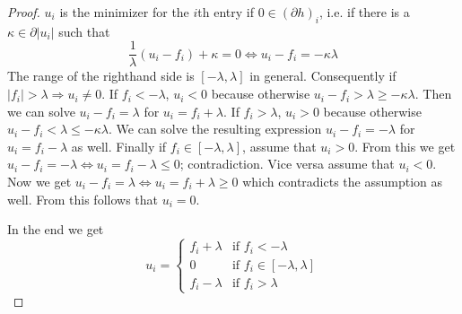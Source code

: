 \documentclass[10pt,a4paper]{article}
\begin{document}
\begin{proof}
  $u_{i}$ is the minimizer for the $i$th entry if $0 \in (\partial h)_{i}$, i.e. if there is a $\kappa \in \partial |u_{i}|$ such that
  \begin{equation*}
    \frac{1}{\lambda} (u_{i} - f_{i}) + \kappa = 0 \Leftrightarrow u_{i} - f_{i} = -\kappa\lambda
  \end{equation*}
  The range of the righthand side is $[-\lambda, \lambda]$ in general.
  Consequently if $|f_{i}| > \lambda \Rightarrow u_{i} \ne 0$.
  If $f_{i} < -\lambda$, $u_{i} < 0$ because otherwise $u_{i} - f_{i} > \lambda \ge -\kappa\lambda$.
  Then we can solve $u_{i} - f_{i} = \lambda$ for $u_{i} = f_{i} + \lambda$.
  If $f_{i} > \lambda$, $u_{i} > 0$ because otherwise $u_{i} - f_{i} < \lambda \le -\kappa\lambda$.
  We can solve the resulting expression $u_{i} - f_{i} = -\lambda$ for $u_{i} = f_{i} - \lambda$ as well.
  Finally if $f_{i} \in [-\lambda, \lambda]$, assume that $u_{i} > 0$.
  From this we get $u_{i} - f_{i} = -\lambda \Leftrightarrow u_{i} = f_{i} - \lambda \le 0$; contradiction.
  Vice versa assume that $u_{i} < 0$.
  Now we get $u_{i} - f_{i} = \lambda \Leftrightarrow u_{i} = f_{i} + \lambda \ge 0$ which contradicts the assumption as well.
  From this follows that $u_{i} = 0$.

  In the end we get
  \begin{equation*}
    u_{i} = \begin{cases}
      f_{i} + \lambda & \text{if $f_{i} < -\lambda$}\\
      0 & \text{if $f_{i} \in [-\lambda, \lambda]$}\\
      f_{i} - \lambda & \text{if $f_{i} > \lambda$}
    \end{cases}
  \end{equation*}
\end{proof}
\end{document}
